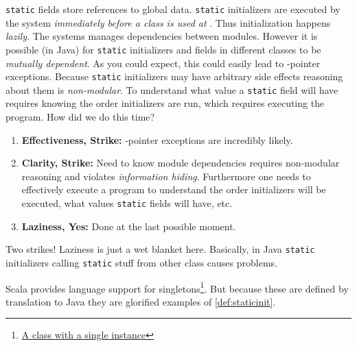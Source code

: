 \documentclass{article}
\begin{document}
\begin{definition}\label{def:staticinit}
  \texttt{static} fields store references to global data.
  \texttt{static} initializers are executed by the system \textit{immediately before a class is used at \runtime{}}.
  Thus initialization happens \textit{lazily}.
  The \runtime{} systems manages dependencies between modules.
  However it is possible (in Java) for \texttt{static} initializers and fields in different classes to be \textit{mutually dependent}.
  As you could expect, this could easily lead to \cringe{}-pointer exceptions.
  Because \texttt{static} initializers may have arbitrary side effects reasoning about them is \textit{non-modular}.
  To understand what value a \texttt{static} field will have requires knowing the order initializers are run, which requires executing the program.
  How did we do this time?
  \begin{enumerate}
  \item \textbf{Effectiveness, Strike:} \cringe{}-pointer exceptions are incredibly likely.
  \item \textbf{Clarity, Strike:} Need to know module dependencies requires non-modular reasoning and violates \textit{information hiding}.
    Furthermore one needs to effectively execute a program to understand the order initializers will be executed, what values \texttt{static} fields will have, etc.
  \item \textbf{Laziness, Yes:} Done at the last possible moment.
  \end{enumerate}
  Two strikes! Laziness is just a wet blanket here.
  Basically, in Java \texttt{static} initializers calling \texttt{static} stuff from other class causes problems.
\end{definition}

\begin{example}
  Scala provides language support for singletons\footnote{\href{https://en.wikipedia.org/wiki/Singleton_pattern}{A class with a single instance}}.
  But because these are defined by translation to Java they are glorified examples of \ref{def:staticinit}.
\end{example}
\end{document}
